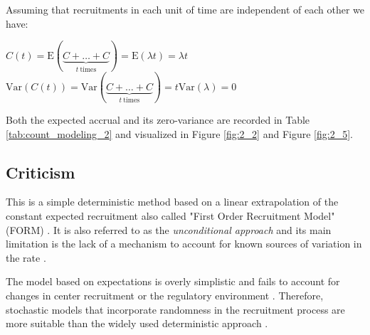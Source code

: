 Assuming that recruitments in each unit of time are independent of each other we have:

$C(t) = \textrm{E}(\underbrace{C+\ldots+C}_{t \ \text{times}}) = \textrm{E}(\lambda t) = \lambda t$\\
$\textrm{Var}(C(t)) = \textrm{Var}(\underbrace{C+\ldots+C}_{t \ \text{times}}) = t \textrm{Var}(\lambda) = 0$

Both the expected accrual and its zero-variance are recorded in Table \ref{tab:count_modeling_2}
and visualized in Figure \ref{fig:2_2} and Figure \ref{fig:2_5}.

\subsection{Criticism}

This is a simple deterministic method based on a linear extrapolation of the constant expected recruitment also called "First Order Recruitment Model" (FORM) \citep{comfort2013}. It is also referred to as the \textit{unconditional approach} and its main limitation is the lack of a mechanism to account for known sources of variation in the rate \citep{carter2005practical}. 

The model based on expectations is overly simplistic and fails to account for changes in center recruitment or the regulatory environment \citep{barnard2010systematic}. Therefore, stochastic models that incorporate randomness in the recruitment process are more suitable than the widely used deterministic approach \citep{zhang2012modeling}.



\begin{table}[h!]
\centering
{}
\caption{Moments and aleatory and epistemic uncertainty of recruitment in one unit of time recruitment covered by different models for counts.}
\label{tab:count_modeling}
\end{table}




